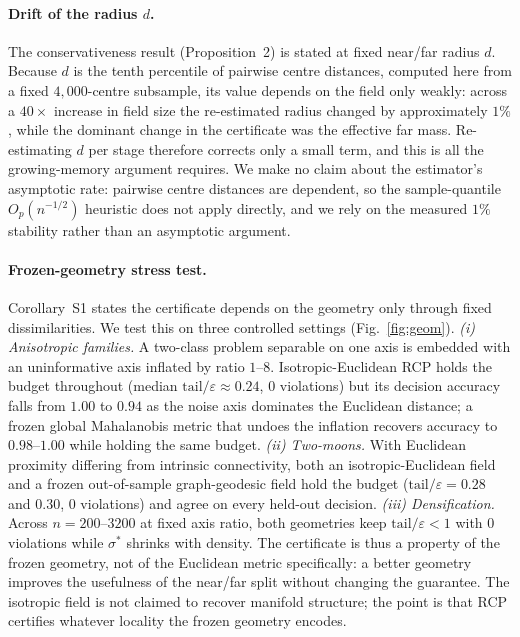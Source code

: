 \documentclass[10pt,twocolumn]{article}
\newcommand{\sstar}{\sigma^{*}}
\begin{document}
\paragraph{Drift of the radius $d$.} The conservativeness result (Proposition~2) is stated at fixed near/far radius $d$. Because $d$ is the tenth percentile of pairwise centre distances, computed here from a fixed $4{,}000$-centre subsample, its value depends on the field only weakly: across a $40\times$ increase in field size the re-estimated radius changed by approximately $1\%$, while the dominant change in the certificate was the effective far mass. Re-estimating $d$ per stage therefore corrects only a small term, and this is all the growing-memory argument requires. We make no claim about the estimator's asymptotic rate: pairwise centre distances are dependent, so the sample-quantile $O_p(n^{-1/2})$ heuristic does not apply directly, and we rely on the measured $1\%$ stability rather than an asymptotic argument.

\paragraph{Frozen-geometry stress test.} Corollary~S1 states the certificate depends on the geometry only through fixed dissimilarities. We test this on three controlled settings (Fig.~\ref{fig:geom}). \emph{(i) Anisotropic families.} A two-class problem separable on one axis is embedded with an uninformative axis inflated by ratio $1$--$8$. Isotropic-Euclidean RCP holds the budget throughout (median $\mathrm{tail}/\varepsilon\approx0.24$, $0$ violations) but its decision accuracy falls from $1.00$ to $0.94$ as the noise axis dominates the Euclidean distance; a frozen global Mahalanobis metric that undoes the inflation recovers accuracy to $0.98$--$1.00$ while holding the same budget. \emph{(ii) Two-moons.} With Euclidean proximity differing from intrinsic connectivity, both an isotropic-Euclidean field and a frozen out-of-sample graph-geodesic field hold the budget ($\mathrm{tail}/\varepsilon=0.28$ and $0.30$, $0$ violations) and agree on every held-out decision. \emph{(iii) Densification.} Across $n=200$--$3200$ at fixed axis ratio, both geometries keep $\mathrm{tail}/\varepsilon<1$ with $0$ violations while $\sstar$ shrinks with density. The certificate is thus a property of the frozen geometry, not of the Euclidean metric specifically: a better geometry improves the usefulness of the near/far split without changing the guarantee. The isotropic field is not claimed to recover manifold structure; the point is that RCP certifies whatever locality the frozen geometry encodes.
\end{document}
